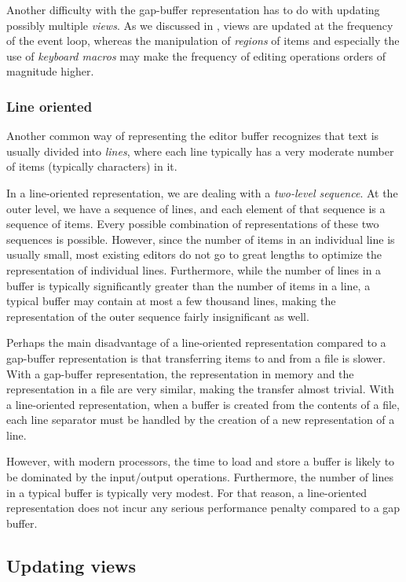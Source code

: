 Another difficulty with the gap-buffer representation has to do with
updating possibly multiple \emph{views}.  As we discussed in
, views are updated at the frequency of the
event loop, whereas the manipulation of \emph{regions} of items and
especially the use of \emph{keyboard macros} may make the frequency of
editing operations orders of magnitude higher.

\subsubsection{Line oriented}
\label{sec-previous-line-oriented}

Another common way of representing the editor buffer recognizes that
text is usually divided into \emph{lines}, where each line typically
has a very moderate number of items (typically characters) in it.

In a line-oriented representation, we are dealing with a
\emph{two-level sequence}.  At the outer level, we have a sequence of
lines, and each element of that sequence is a sequence of items.
Every possible combination of representations of these two sequences
is possible.  However, since the number of items in an individual line
is usually small, most existing editors do not go to great lengths to
optimize the representation of individual lines.  Furthermore, while
the number of lines in a buffer is typically significantly greater
than the number of items in a line, a typical buffer may contain at
most a few thousand lines, making the representation of the outer
sequence fairly insignificant as well.

Perhaps the main disadvantage of a line-oriented representation
compared to a gap-buffer representation is that transferring items to
and from a file is slower.  With a gap-buffer representation, the
representation in memory and the representation in a file are very
similar, making the transfer almost trivial.  With a line-oriented
representation, when a buffer is created from the contents of a file,
each line separator must be handled by the creation of a new
representation of a line.

However, with modern processors, the time to load and store a buffer
is likely to be dominated by the input/output operations.
Furthermore, the number of lines in a typical buffer is typically very
modest.  For that reason, a line-oriented representation does not
incur any serious performance penalty compared to a gap buffer.

\subsection{Updating views}


